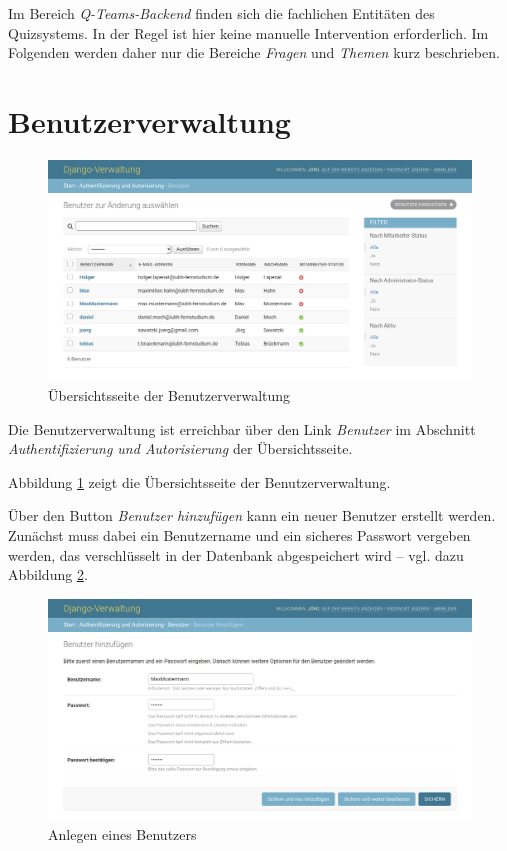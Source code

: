 \documentclass[a4paper,11pt,listof=numbered,glossary=totoc,parskip=half,toc=bib]{scrreprt}
\begin{document}
\begin{appendices}
	Im Bereich \textit{Q-Teams-Backend} finden sich die fachlichen Entitäten des Quizsystems. In der Regel ist hier keine manuelle Intervention erforderlich. Im Folgenden werden daher nur die Bereiche \textit{Fragen} und \textit{Themen} kurz beschrieben. 
	
	\section{Benutzerverwaltung}
	
	\begin{figure}
		\centering
		\includegraphics[width=\textwidth]{benutzer}
		\caption{Übersichtsseite der Benutzerverwaltung}
		\label{fig:benutzer}
	\end{figure}
	
	Die Benutzerverwaltung ist erreichbar über den Link \textit{Benutzer} im Abschnitt \textit{Authentifizierung und Autorisierung} der Übersichtsseite.
	
	Abbildung \ref{fig:benutzer} zeigt die Übersichtsseite der Benutzerverwaltung.
	
	Über den Button \textit{Benutzer hinzufügen} kann ein neuer Benutzer erstellt werden. Zunächst muss dabei ein Benutzername und ein sicheres Passwort vergeben werden, das verschlüsselt in der Datenbank abgespeichert wird -- vgl. dazu Abbildung \ref{fig:neuerbenutzer}.
	
	\begin{figure}
		\centering
		\includegraphics[width=\textwidth]{neuerbenutzer}
		\caption{Anlegen eines Benutzers}
		\label{fig:neuerbenutzer}
	\end{figure}
	

\end{appendices}
\end{document}
